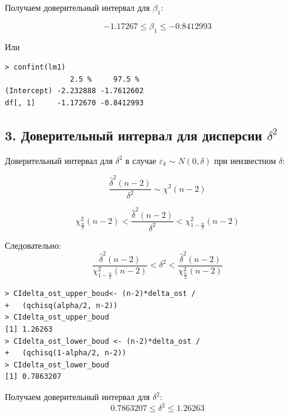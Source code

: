\documentclass[14pt,a4paper]{scrartcl}
\begin{document}
Получаем доверительный интервал для $\beta_1$:

\begin{equation*}
-1.17267 \leq \beta_1 \leq -0.8412993
\end{equation*}

Или
\begin{verbatim}
> confint(lm1)
			   2.5 %     97.5 %
(Intercept) -2.232888 -1.7612602
df[, 1]     -1.172670 -0.8412993
\end{verbatim}

\subsection*{3. Доверительный интервал для дисперсии $\delta^2$}

Доверительный интервал для $\delta^2$ в случае $\varepsilon_k \sim N(0,\delta)$ при неизвестном $\delta$:

\begin{equation*}
	\frac{\hat{\delta}^{2}(n-2)}{\delta^{2}} \sim \chi^{2}(n-2)	
\end{equation*}

\begin{equation*}
	\chi_{\frac{\alpha}{2}}^{2}(n-2)<\frac{\hat{\delta}^{2}(n-2)}{\delta^{2}}<\chi_{1-\frac{\alpha}{2}}^{2}(n-2)
\end{equation*}


Следовательно:
\begin{equation*}
\frac{\hat{\delta}^{2}(n-2)}{\chi_{1-\frac{\alpha}{2}}^{2}(n-2)}<\delta^{2}<\frac{\hat{\delta}^{2}(n-2)}{\chi_{\frac{\alpha}{2}}^{2}(n-2)}
\end{equation*}

\begin{verbatim}
> CIdelta_ost_upper_boud<- (n-2)*delta_ost / 
+   (qchisq(alpha/2, n-2))
> CIdelta_ost_upper_boud
[1] 1.26263
> CIdelta_ost_lower_boud <- (n-2)*delta_ost / 
+   (qchisq(1-alpha/2, n-2))
> CIdelta_ost_lower_boud
[1] 0.7863207
\end{verbatim}

Получаем доверительный интервал для $\delta^2$:
\begin{equation*}
	0.7863207 \leq \delta^2 \leq 1.26263
\end{equation*}
\end{document}
